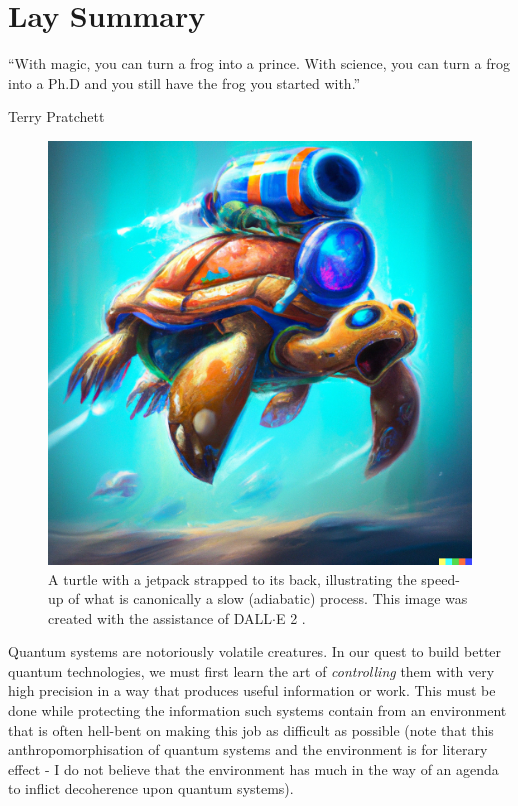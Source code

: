 \chapter{Lay Summary}
\epigraph{“With magic, you can turn a frog into a prince. With science, you can turn a frog into a Ph.D and you still have the frog you started with.”}{Terry Pratchett}

\begin{figure}
\centering
\includegraphics[width=0.9\linewidth]{images/COLD_turle.png} \caption[DALL$\cdot$E turtle illustration.]{A turtle with a jetpack strapped to its back, illustrating the speed-up of what is canonically a slow (adiabatic) process. This image was created with the assistance of DALL$\cdot$E 2 \cite{noauthor_dalle_nodate}.}\label{fig:COLD_TURTLE}
\end{figure}

Quantum systems are notoriously volatile creatures. In our quest to build better quantum technologies, we must first learn the art of \emph{controlling} them with very high precision in a way that produces useful information or work. This must be done while protecting the information such systems contain from an environment that is often hell-bent on making this job as difficult as possible (note that this anthropomorphisation of quantum systems and the environment is for literary effect - I do not believe that the environment has much in the way of an agenda to inflict decoherence upon quantum systems).

